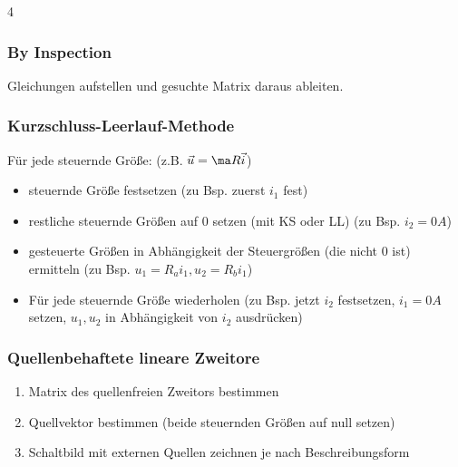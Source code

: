 \documentclass[fs, footer]{latex4ei}
\begin{document}
\begin{multicols*}{4}
    \subsubsection{By Inspection}
    Gleichungen aufstellen und gesuchte Matrix daraus ableiten.
    \subsubsection{Kurzschluss-Leerlauf-Methode}
    Für jede steuernde Größe: (z.B. $\vec u = \ma R \vec i$)
    \begin{itemize}
        \item steuernde Größe festsetzen (zu Bsp. zuerst $i_1$ fest)
        \item restliche steuernde Größen auf 0 setzen (mit KS oder LL) (zu Bsp. $i_2=0A$)
        \item gesteuerte Größen in Abhängigkeit der Steuergrößen (die nicht 0 ist) ermitteln (zu Bsp. $u_1=R_a i_1, u_2=R_b i_1$)
        \item Für jede steuernde Größe wiederholen (zu Bsp. jetzt $i_2$ festsetzen, $i_1=0A$ setzen, $u_1, u_2$ in Abhängigkeit von $i_2$ ausdrücken)
    \end{itemize}
    \subsubsection{Quellenbehaftete lineare Zweitore}
    \begin{enumerate}\itemsep0pt
        \item Matrix des quellenfreien Zweitors bestimmen
        \item Quellvektor bestimmen (beide steuernden Größen auf null setzen)
        \item Schaltbild mit externen Quellen zeichnen je nach Beschreibungsform
    \end{enumerate}


\end{multicols*}
\end{document}
